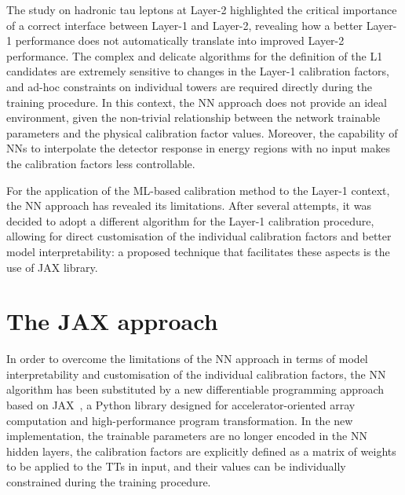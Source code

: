 \bigbreak

The study on hadronic tau leptons at Layer-2 highlighted the critical importance of a correct interface between Layer-1 and Layer-2, revealing how a better Layer-1 performance does not automatically translate into improved Layer-2 performance. The complex and delicate algorithms for the definition of the L1 candidates are extremely sensitive to changes in the Layer-1 calibration factors, and ad-hoc constraints on individual towers are required directly during the training procedure.
In this context, the NN approach does not provide an ideal environment, given the non-trivial relationship between the network trainable parameters and the physical calibration factor values. 
Moreover, the capability of NNs to interpolate the detector response in energy regions with no input makes the calibration factors less controllable.

For the application of the ML-based calibration method to the Layer-1 context, the NN approach has revealed its limitations. After several attempts, it was decided to adopt a different algorithm for the Layer-1 calibration procedure, allowing for direct customisation of the individual calibration factors and better model interpretability: a proposed technique that facilitates these aspects is the use of JAX library.

\section{The JAX approach} 

In order to overcome the limitations of the NN approach in terms of model interpretability and customisation of the individual calibration factors, the NN algorithm has been substituted by a new differentiable programming approach based on JAX~\cite{}, a Python library designed for accelerator-oriented array computation and high-performance program transformation.
In the new implementation, the trainable parameters are no longer encoded in the NN hidden layers, the calibration factors are explicitly defined as a matrix of weights to be applied to the TTs in input, and their values can be individually constrained during the training procedure.

